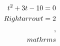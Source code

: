 \documentclass[preview]{standalone}
\begin{document}
\begin{align*}
\special{dvisvgm:raw <g id='unique000'>}t^2 + 3t - 10 = 0 \\Rightarrow t = 2\\,\\mathrm{s}\special{dvisvgm:raw </g>}
\end{align*}
\end{document}
